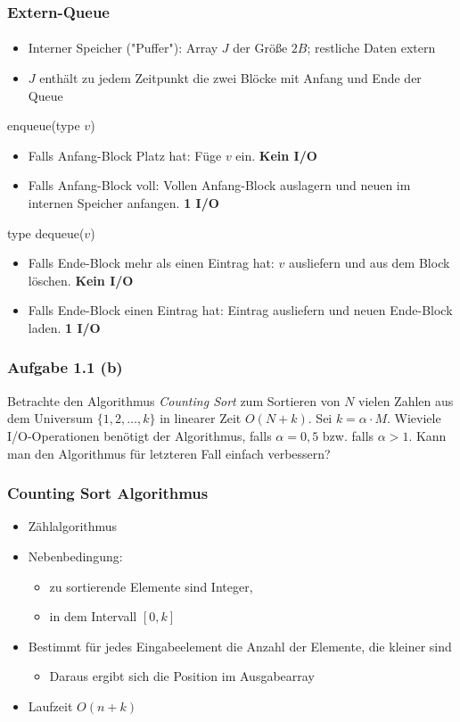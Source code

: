 \documentclass{beamer}
\begin{document}
\begin{frame}
  \frametitle{Extern-Queue}
  \framesubtitle{}
  \begin{itemize}[<+->]
    \item Interner Speicher ("Puffer"): Array $J$ der Größe $2B$; restliche Daten extern
    \item $J$ enthält zu jedem Zeitpunkt die zwei Blöcke mit Anfang und Ende der Queue
  \end{itemize}

  enqueue(type $v$)
  \begin{itemize}[<+->]
    \item Falls Anfang-Block Platz hat: Füge $v$ ein. \bf{Kein I/O}
    \item Falls Anfang-Block voll: Vollen Anfang-Block auslagern und neuen im internen Speicher anfangen. \bf{1 I/O}
  \end{itemize}

  type dequeue($v$)
  \begin{itemize}[<+->]
    \item Falls Ende-Block mehr als einen Eintrag hat: $v$ ausliefern und aus dem Block löschen. \bf{Kein I/O}
    \item Falls Ende-Block einen Eintrag hat: Eintrag ausliefern und neuen Ende-Block laden. \bf{1 I/O}
  \end{itemize}
\end{frame}



\begin{frame}
  \frametitle{Aufgabe 1.1 (b)}

  Betrachte den Algorithmus \emph{Counting Sort} zum Sortieren von $N$ vielen Zahlen aus dem Universum $\{1,2,\dots{},k\}$ in linearer Zeit $O(N+k)$. 
  Sei $k = \alpha \cdot M$.
  Wieviele I/O-Operationen benötigt der Algorithmus, falls $\alpha = 0,5$ bzw. falls $\alpha > 1$.
  Kann man den Algorithmus für letzteren Fall einfach verbessern?
\end{frame}

\begin{frame}
  \frametitle{Counting Sort Algorithmus}
  \begin{itemize}
    \item Zählalgorithmus
    \item Nebenbedingung:
    \begin{itemize}
      \item zu sortierende Elemente sind Integer,
      \item in dem Intervall $[0,k]$
    \end{itemize}
    \item Bestimmt für jedes Eingabeelement die Anzahl der Elemente, die kleiner sind
    \begin{itemize}
      \item Daraus ergibt sich die Position im Ausgabearray
    \end{itemize}
    \item Laufzeit $O(n+k)$
  \end{itemize}
\end{frame}
\end{document}
